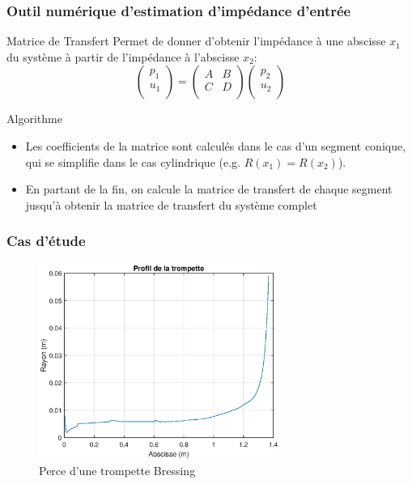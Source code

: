 
\begin{frame}
  \frametitle{Outil numérique d'estimation d'impédance d'entrée}
  
  \pause
  \begin{block}{Matrice de Transfert}
    Permet de donner d'obtenir l'impédance à une abscisse $x_1$ du système à
    partir de l'impédance à l'abscisse $x_2$:
    \begin{equation*}
      \begin{pmatrix}
        p_1\\
        u_1\\
      \end{pmatrix}
      =
      \begin{pmatrix}
        A &B\\
        C &D\\
      \end{pmatrix}
      \begin{pmatrix}
        p_2\\
        u_2\\
      \end{pmatrix}
    \end{equation*}
  \end{block}

  \vspace{20pt}
  \pause
  \begin{exampleblock}{Algorithme}
  \begin{itemize}
    \item Les coefficients de la matrice sont calculés dans le cas d'un segment
  conique, qui se simplifie dans le cas cylindrique (e.g. $R(x_1) = R(x_2)$).
  \pause
    \item En partant de la fin, on calcule la matrice de transfert de chaque
      segment jusqu'à obtenir la matrice de transfert du système complet
  \end{itemize}
\end{exampleblock}
\end{frame}

\begin{frame}
  \frametitle{Cas d'étude}
    \begin{figure}
      \centering
      \captionsetup{justification=centering, margin=1cm}
      \includegraphics[width=0.7\textwidth]{img/prof_tromp.eps}
      \caption{Perce d'une trompette Bressing}
    \end{figure}
\end{frame}


